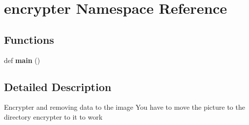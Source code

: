 \hypertarget{namespaceencrypter}{}\section{encrypter Namespace Reference}
\label{namespaceencrypter}
\subsection*{Functions}
\begin{DoxyCompactItemize}
\item 
\mbox{\label{namespaceencrypter_a23bd1ec74dbc4cd1ec87b89828cd5ad7}} 
def {\bfseries main} ()
\end{DoxyCompactItemize}


\subsection{Detailed Description}
\begin{DoxyVerb}Encrypter and removing data to the image
You have to move the picture to the directory encrypter to it to work\end{DoxyVerb}
 